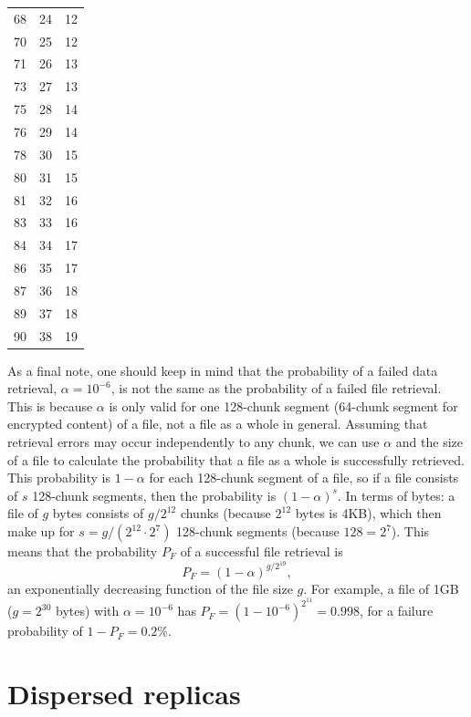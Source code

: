 \documentclass[manuscript,screen,review]{acmart}
\begin{document}
\begin{table}[!ht]
\begin{minipage}{.49\linewidth}
\begin{tabular}{|r|r|r|}
68 & 24 & 12\\
70 & 25 & 12\\
71 & 26 & 13\\
73 & 27 & 13\\
75 & 28 & 14\\
76 & 29 & 14\\
78 & 30 & 15\\
80 & 31 & 15\\
81 & 32 & 16\\
83 & 33 & 16\\
84 & 34 & 17\\
86 & 35 & 17\\
87 & 36 & 18\\
89 & 37 & 18\\
90 & 38 & 19\\
\hline
\end{tabular}
\end{minipage}
\label{tbl:paranoid}
\end{table}

As a final note, one should keep in mind that the probability of a failed data retrieval, $\alpha = 10^{-6}$, is not the same as the probability of a failed file retrieval. This is because $\alpha$ is only valid for one 128-chunk segment (64-chunk segment for encrypted content) of a file, not a file as a whole in general. Assuming that retrieval errors may occur independently to any chunk, we can use $\alpha$ and the size of a file to calculate the probability that a file as a whole is successfully retrieved. This probability is $1 - \alpha$ for each 128-chunk segment of a file, so if a file consists of $s$ 128-chunk segments, then the probability is $(1-\alpha)^s$. In terms of bytes: a file of $g$ bytes consists of $g / 2^{12}$ chunks (because $2^{12}$ bytes is 4KB), which then make up for $s = g / (2^{12} \cdot 2^{7})$ 128-chunk segments (because $128 = 2^7$). This means that the probability $P_F$ of a successful file retrieval is
\begin{equation}
  P_F = (1 - \alpha)^{g/2^{19}} ,
  \label{eq-P-file}
\end{equation}
an exponentially decreasing function of the file size $g$. For example, a file of 1GB ($g = 2^{30}$ bytes) with $\alpha = 10^{-6}$ has $P_F = (1 - 10^{-6})^{2^{11}} = 0.998$, for a failure probability of $1 - P_F = 0.2\%$.




\section{Dispersed replicas}
\label{sec:dispersed-replicas}
\end{document}

